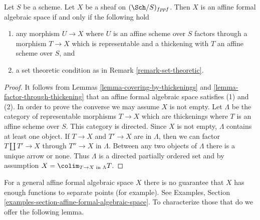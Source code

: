 \begin{lemma}
\label{lemma-characterize-affine-formal-algebraic-space}
Let $S$ be a scheme. Let $X$ be a sheaf on $(\Sch/S)_{fppf}$.
Then $X$ is an affine formal algebraic space if and only if
the following hold
\begin{enumerate}
\item any morphism $U \to X$ where $U$ is an affine scheme over $S$
factors through a morphism $T \to X$ which is representable and a
thickening with $T$ an affine scheme over $S$, and
\item a set theoretic condition as in Remark \ref{remark-set-theoretic}.
\end{enumerate}
\end{lemma}

\begin{proof}
It follows from Lemmas \ref{lemma-covering-by-thickenings} and
\ref{lemma-factor-through-thickening} that an affine formal algebraic space
satisfies (1) and (2). In order to prove the converse we may
assume $X$ is not empty.
Let $\Lambda$ be the category of representable morphisms $T \to X$ which are
thickenings where $T$ is an affine scheme over $S$. This category
is directed. Since $X$ is not empty, $\Lambda$ contains at least one
object. If $T \to X$ and $T' \to X$ are in $\Lambda$, then we can
factor $T \amalg T' \to X$ through $T'' \to X$ in $\Lambda$. Between
any two objects of $\Lambda$ there is a unique arrow or none. Thus
$\Lambda$ is a directed partially ordered set and by assumption
$X = \colim_{T \to X\text{ in }\Lambda} T$.
\end{proof}

\noindent
For a general affine formal algebraic space $X$ there is no guarantee
that $X$ has enough functions to separate points (for example).
See Examples, Section \ref{examples-section-affine-formal-algebraic-space}.
To characterize those that do we offer the following lemma.

